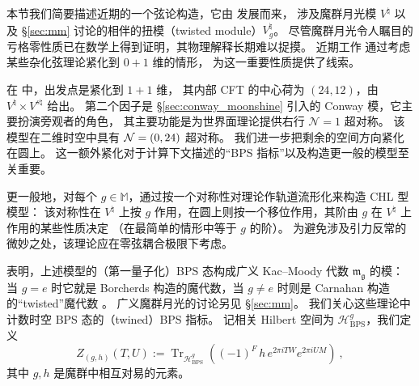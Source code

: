 \documentclass[11pt,a4paper,fontset=windows]{ctexart}
\numberwithin{equation}{section}
\newcommand{\MM}{\mathbb{M}}
\newcommand{\tr}{\operatorname{Tr}}
\begin{document}
本节我们简要描述近期的一个弦论构造，它由 \cite{paquette2016monstrous,Paquette:2017xui} 发展而来，
涉及魔群月光模 $V^\natural$ 以及 \S\ref{sec:mm} 讨论的相伴的扭模（twisted module）$V^\natural_g$。
尽管魔群月光令人瞩目的亏格零性质已在数学上得到证明，其物理解释长期难以捉摸。
近期工作 \cite{paquette2016monstrous,Paquette:2017xui} 通过考虑某些杂化弦理论紧化到 $0+1$ 维的情形，
为这一重要性质提供了线索。


在 \cite{paquette2016monstrous,Paquette:2017xui} 中，出发点是紧化到 $1+1$ 维，
其内部 CFT 的中心荷为 $(24,12)$，由 $V^\natural\times V_{}^{s\natural}$ 给出。
第二个因子是 \S\ref{sec:conway_moonshine} 引入的 Conway 模，它主要扮演旁观者的角色，
其主要功能是为世界面理论提供右行 $\mathcal{N}=1$ 超对称。
该模型在二维时空中具有 ${\cal N}=(0,24)$ 超对称。
我们进一步把剩余的空间方向紧化在圆上。
这一额外紧化对于计算下文描述的“BPS 指标”以及构造更一般的模型至关重要。


更一般地，对每个 $g\in\MM$，通过按一个对称性对理论作轨道流形化来构造 CHL 型模型：
该对称性在 $V^\natural$ 上按 $g$ 作用，在圆上则按一个移位作用，其阶由 $g$ 在 $V^\natural$ 上作用的某些性质决定
（在最简单的情形中等于 $g$ 的阶）。
为避免涉及引力反常的微妙之处，该理论应在零弦耦合极限下考虑。


\cite{paquette2016monstrous} 表明，上述模型的（第一量子化）BPS 态构成广义 Kac–Moody 代数 $\mathfrak{m_g}$ 的模：
当 $g= e$ 时它就是 Borcherds 构造的魔代数，当 $g\neq e$ 时则是 Carnahan 构造的“twisted”魔代数
\cite{Carnahan2008,MR2904095,carnahan2012generalized}。
广义魔群月光的讨论另见 \S\ref{sec:mm}。
我们关心这些理论中计数时空 BPS 态的（twined）BPS 指标。
记相关 Hilbert 空间为 $\mathcal{H}^g_{\text{BPS}}$，我们定义
\begin{equation}
Z_{(g,h)}(T,U):=\tr_{\mathcal{H}^g_{\text{BPS}}}\left((-1)^F \, h \, e^{2\pi iTW}e^{2\pi iUM}\right)~,
\end{equation}
其中 $g,h$ 是魔群中相互对易的元素。
\end{document}
